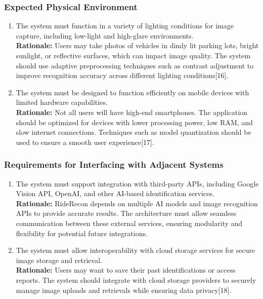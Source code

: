 \documentclass[]{article}
\begin{document}
\subsubsection{Expected Physical Environment}
\label{ssub:expected_physical_environment}
\begin{enumerate}[label={OE-EPE\arabic*.}]
    \item The system must function in a variety of lighting conditions for image capture, including low-light and high-glare environments.\\
   \textbf{Rationale:} Users may take photos of vehicles in dimly lit parking lots, bright sunlight, or reflective surfaces, which can impact image quality. The system should use adaptive preprocessing techniques such as contrast adjustment to improve recognition accuracy across different lighting conditions[16].
   \item The system must be designed to function efficiently on mobile devices with limited hardware capabilities.\\
   \textbf{Rationale:} Not all users will have high-end smartphones. The application should be optimized for devices with lower processing power, low RAM, and slow internet connections. Techniques such as model quantization should be used to ensure a smooth user experience[17].
\end{enumerate}

\subsubsection{Requirements for Interfacing with Adjacent Systems}
\label{ssub:requirements_for_interfacing_with_adjacent_systems}
\begin{enumerate}[label={OE-IA\arabic*.}]
    \item The system must support integration with third-party APIs, including Google Vision API, OpenAI, and other AI-based identification services.\\
	\textbf{Rationale:} RideRecon depends on multiple AI models and image recognition APIs to provide accurate results. The architecture must allow seamless communication between these external services, ensuring modularity and flexibility for potential future integrations.
	\item The system must allow interoperability with cloud storage services for secure image storage and retrieval.\\
	\textbf{Rationale:} Users may want to save their past identifications or access reports. The system should integrate with cloud storage providers to securely manage image uploads and retrievals while ensuring data privacy[18].
\end{enumerate}
\end{document}
